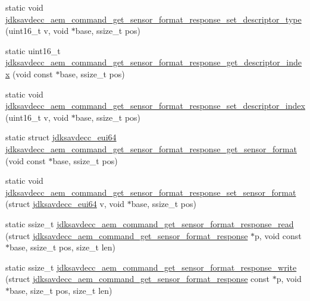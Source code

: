 \begin{DoxyCompactItemize}
static void \hyperlink{group__command__get__sensor__format__response_ga83aadba3b24deb72b7f440ddc03a5dfa}{jdksavdecc\+\_\+aem\+\_\+command\+\_\+get\+\_\+sensor\+\_\+format\+\_\+response\+\_\+set\+\_\+descriptor\+\_\+type} (uint16\+\_\+t v, void $\ast$base, ssize\+\_\+t pos)
\item 
static uint16\+\_\+t \hyperlink{group__command__get__sensor__format__response_ga2f91d0ef4f00b5e3d44b0fe08a3e5f39}{jdksavdecc\+\_\+aem\+\_\+command\+\_\+get\+\_\+sensor\+\_\+format\+\_\+response\+\_\+get\+\_\+descriptor\+\_\+index} (void const $\ast$base, ssize\+\_\+t pos)
\item 
static void \hyperlink{group__command__get__sensor__format__response_ga8750b90945df086c299ecbba4612132c}{jdksavdecc\+\_\+aem\+\_\+command\+\_\+get\+\_\+sensor\+\_\+format\+\_\+response\+\_\+set\+\_\+descriptor\+\_\+index} (uint16\+\_\+t v, void $\ast$base, ssize\+\_\+t pos)
\item 
static struct \hyperlink{structjdksavdecc__eui64}{jdksavdecc\+\_\+eui64} \hyperlink{group__command__get__sensor__format__response_ga93bcc5e178a390b0d3e847b1728672f9}{jdksavdecc\+\_\+aem\+\_\+command\+\_\+get\+\_\+sensor\+\_\+format\+\_\+response\+\_\+get\+\_\+sensor\+\_\+format} (void const $\ast$base, ssize\+\_\+t pos)
\item 
static void \hyperlink{group__command__get__sensor__format__response_ga60cd6fc21da145e7ee17d93791ec5186}{jdksavdecc\+\_\+aem\+\_\+command\+\_\+get\+\_\+sensor\+\_\+format\+\_\+response\+\_\+set\+\_\+sensor\+\_\+format} (struct \hyperlink{structjdksavdecc__eui64}{jdksavdecc\+\_\+eui64} v, void $\ast$base, ssize\+\_\+t pos)
\item 
static ssize\+\_\+t \hyperlink{group__command__get__sensor__format__response_ga1191fbc463ba88df5abdde0e50c380db}{jdksavdecc\+\_\+aem\+\_\+command\+\_\+get\+\_\+sensor\+\_\+format\+\_\+response\+\_\+read} (struct \hyperlink{structjdksavdecc__aem__command__get__sensor__format__response}{jdksavdecc\+\_\+aem\+\_\+command\+\_\+get\+\_\+sensor\+\_\+format\+\_\+response} $\ast$p, void const $\ast$base, ssize\+\_\+t pos, size\+\_\+t len)
\item 
static ssize\+\_\+t \hyperlink{group__command__get__sensor__format__response_gaa1b2fca58184fc86c8135c760a439ff0}{jdksavdecc\+\_\+aem\+\_\+command\+\_\+get\+\_\+sensor\+\_\+format\+\_\+response\+\_\+write} (struct \hyperlink{structjdksavdecc__aem__command__get__sensor__format__response}{jdksavdecc\+\_\+aem\+\_\+command\+\_\+get\+\_\+sensor\+\_\+format\+\_\+response} const $\ast$p, void $\ast$base, size\+\_\+t pos, size\+\_\+t len)
\end{DoxyCompactItemize}


